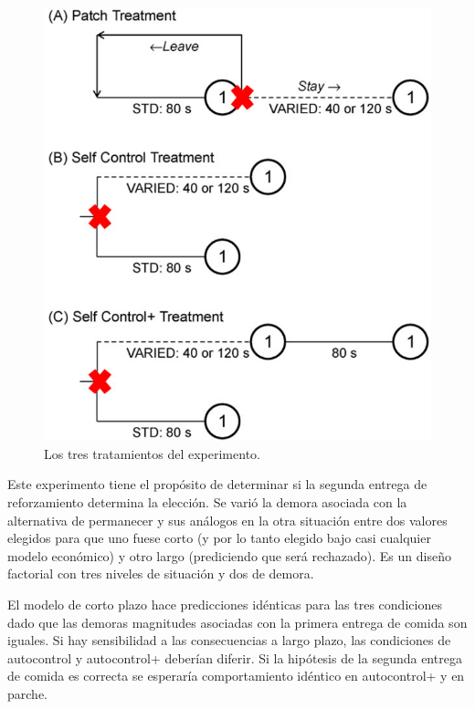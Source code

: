 \documentclass[a4paper,12pt]{article}
\begin{document}
\begin{figure}[ht]
	\begin{center}
		\includegraphics[scale=0.5]{Stephens2009(2).png}
		\caption{Los tres tratamientos del experimento.}
	\end{center}
\end{figure}

Este experimento tiene el propósito de determinar si la segunda entrega de reforzamiento determina la elección. Se varió la demora asociada con la alternativa de permanecer y sus análogos en la otra situación entre dos valores elegidos para que uno fuese corto (y por lo tanto elegido bajo casi cualquier modelo económico) y otro largo (prediciendo que será rechazado). Es un diseño factorial con tres niveles de situación y dos de demora.

El modelo de corto plazo hace predicciones idénticas para las tres condiciones dado que las demoras  magnitudes asociadas con la primera entrega de comida son iguales. Si hay sensibilidad a las consecuencias a largo plazo, las condiciones de autocontrol y autocontrol+ deberían diferir. Si la hipótesis de la segunda entrega de comida es correcta se esperaría comportamiento idéntico en autocontrol+ y en parche.
\end{document}
